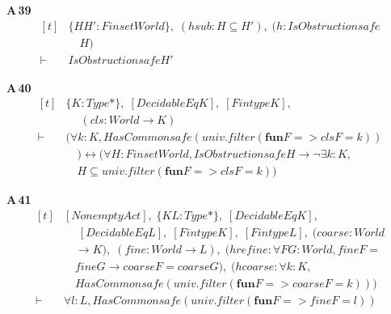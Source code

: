 \noindent\textbf{A\,39}\quad{}
{\footnotesize\[ \begin{aligned}[t]
&\{ \mathit{H} \mathit{H'} : \mathit{Finset} \mathit{World}\},\; (\mathit{hsub} : \mathit{H} \subseteq \mathit{H'}),\; (\mathit{h} : \mathit{IsObstruction} \mathit{safe}\\
&\quad \mathit{H})\\
\vdash\;&\mathit{IsObstruction} \mathit{safe} \mathit{H'}
\end{aligned} \]}

\noindent\textbf{A\,40}\quad{}
{\footnotesize\[ \begin{aligned}[t]
&\{ \mathit{K} : \mathit{Type}*\},\; [\mathit{DecidableEq} \mathit{K}],\; [\mathit{Fintype} \mathit{K}],\\
&\quad \; (\mathit{cls} : \mathit{World} \to \mathit{K})\\
\vdash\;&(\forall \mathit{k} : \mathit{K}, \mathit{HasCommon} \mathit{safe} (\mathit{univ}.\mathit{filter} (\mathbf{fun} \mathit{F} => \mathit{cls} \mathit{F} = \mathit{k}))\\
&\quad ) \leftrightarrow (\forall \mathit{H} : \mathit{Finset} \mathit{World}, \mathit{IsObstruction} \mathit{safe} \mathit{H} \to \neg \exists \mathit{k} : \mathit{K},\\
&\quad \mathit{H} \subseteq \mathit{univ}.\mathit{filter} (\mathbf{fun} \mathit{F} => \mathit{cls} \mathit{F} = \mathit{k}))
\end{aligned} \]}

\noindent\textbf{A\,41}\quad{}
{\footnotesize\[ \begin{aligned}[t]
&[\mathit{Nonempty} \mathit{Act}],\; \{ \mathit{K} \mathit{L} : \mathit{Type}*\},\; [\mathit{DecidableEq} \mathit{K}],\\
&\quad \; [\mathit{DecidableEq} \mathit{L}],\; [\mathit{Fintype} \mathit{K}],\; [\mathit{Fintype} \mathit{L}],\; (\mathit{coarse} : \mathit{World}\\
&\quad \to \mathit{K}),\; (\mathit{fine} : \mathit{World} \to \mathit{L}),\; (\mathit{hrefine} : \forall \mathit{F} \mathit{G} : \mathit{World}, \mathit{fine} \mathit{F} =\\
&\quad \mathit{fine} \mathit{G} \to \mathit{coarse} \mathit{F} = \mathit{coarse} \mathit{G}),\; (\mathit{hcoarse} : \forall \mathit{k} : \mathit{K},\\
&\quad \mathit{HasCommon} \mathit{safe} (\mathit{univ}.\mathit{filter} (\mathbf{fun} \mathit{F} => \mathit{coarse} \mathit{F} = \mathit{k})))\\
\vdash\;&\forall \mathit{l} : \mathit{L}, \mathit{HasCommon} \mathit{safe} (\mathit{univ}.\mathit{filter} (\mathbf{fun} \mathit{F} => \mathit{fine} \mathit{F} = \mathit{l}))
\end{aligned} \]}

